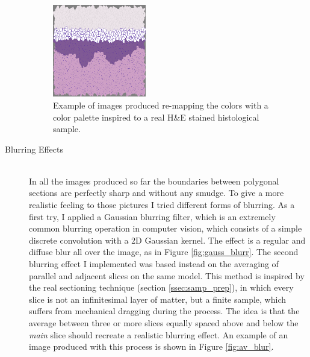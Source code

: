 \begin{description}
        \begin{figure}
            \centering
            \includegraphics[width = 0.4\textwidth]{images/derma_slice}
            \caption{Example of images produced re-mapping the colors with a color palette inspired to a real H\&E stained histological sample.}
            \label{fig:derma_slice}
        \end{figure}

        \item [Blurring Effects] \hfill \\
        In all the images produced so far the boundaries between polygonal sections are perfectly sharp and without any smudge. To give a more realistic feeling to those pictures I tried different forms of blurring. As a first try, I applied a Gaussian blurring filter, which is an extremely common blurring operation in computer vision, which consists of a simple discrete convolution with a 2D Gaussian kernel. The effect is a regular and diffuse blur all over the image, as in Figure \ref{fig:gauss_blurr}. The second blurring effect I implemented was based instead on the averaging of parallel and adjacent slices on the same model. This method is inspired by the real sectioning technique (section \ref{ssec:samp_prep}), in which every slice is not an infinitesimal layer of matter, but a finite sample, which suffers from mechanical dragging during the process. The idea is that the average between three or more slices equally spaced above and below the \textit{main} slice should recreate a realistic blurring effect. An example of an image produced with this process is shown in Figure \ref{fig:av_blur}.


\end{description}
